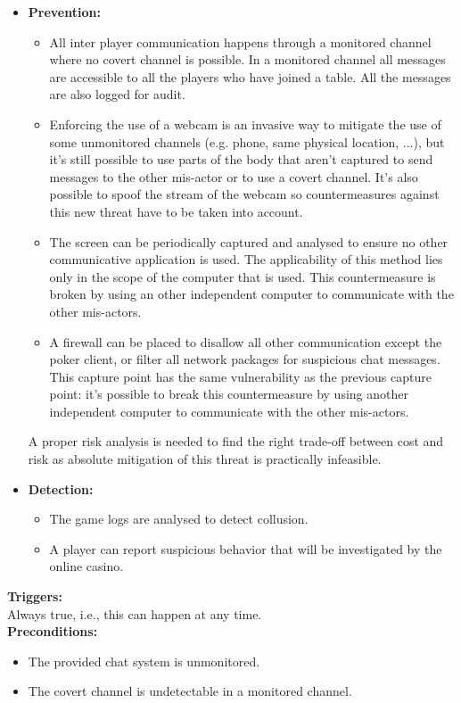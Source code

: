 \documentclass[a4paper,11pt]{report}
\begin{document}
\begin{itemize}
\item \textbf{Prevention:}
\begin{itemize}
\item All inter player communication happens through a monitored channel where no covert channel is possible. In a monitored channel all messages are accessible to all the players who have joined a table. All the messages are also logged for audit.
\item Enforcing the use of a webcam is an invasive way to mitigate the use of some unmonitored channels (e.g. phone, same physical location, ...), but it's still possible to use parts of the body that aren't captured to send messages to the other mis-actor or to use a covert channel. It's also possible to spoof the stream of the webcam so countermeasures against this new threat have to be taken into account.
\item The screen can be periodically captured and analysed to ensure no other communicative application is used. The applicability of this method lies only in the scope of the computer that is used. This countermeasure is broken by using an other independent computer to communicate with the other mis-actors.
\item A firewall can be placed to disallow all other communication except the poker client, or filter all network packages for suspicious chat messages. This capture point has the same vulnerability as the previous capture point: it's possible to break this countermeasure by using another independent computer to communicate with the other mis-actors.
\end{itemize}
A proper risk analysis is needed to find the right trade-off between cost and risk as absolute mitigation of this threat is practically infeasible.
\item \textbf{Detection:}
\begin{itemize}
\item The game logs are analysed to detect collusion.
\item A player can report suspicious behavior that will be investigated by the online casino.
\end{itemize}
\end{itemize}
\textbf{Triggers:}\\
Always true, i.e., this can happen at any time. \\
\textbf{Preconditions:}
\begin{itemize}
\item The provided chat system is unmonitored.
\item The covert channel is undetectable in a monitored channel.
\end{itemize}
\end{document}
